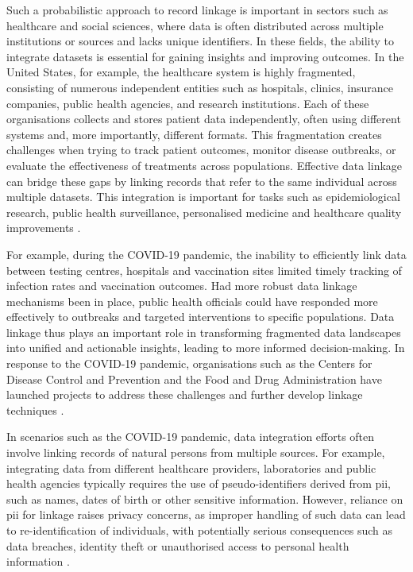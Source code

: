 Such a probabilistic approach to record linkage is important in sectors such as healthcare and social sciences, where data is often distributed across multiple institutions or sources and lacks unique identifiers.
In these fields, the ability to integrate datasets is essential for gaining insights and improving outcomes.
In the United States, for example, the healthcare system is highly fragmented, consisting of numerous independent entities such as hospitals, clinics, insurance companies, public health agencies, and research institutions.
Each of these organisations collects and stores patient data independently, often using different systems and, more importantly, different formats.
This fragmentation creates challenges when trying to track patient outcomes, monitor disease outbreaks, or evaluate the effectiveness of treatments across populations.
Effective data linkage can bridge these gaps by linking records that refer to the same individual across multiple datasets.
This integration is important for tasks such as epidemiological research, public health surveillance, personalised medicine and healthcare quality improvements \cite{pathak2024privacy, vatsalan2017privacy}.

For example, during the COVID-19 pandemic, the inability to efficiently link data between testing centres, hospitals and vaccination sites limited timely tracking of infection rates and vaccination outcomes.
Had more robust data linkage mechanisms been in place, public health officials could have responded more effectively to outbreaks and targeted interventions to specific populations.
Data linkage thus plays an important role in transforming fragmented data landscapes into unified and actionable insights, leading to more informed decision-making.
In response to the COVID-19 pandemic, organisations such as the Centers for Disease Control and Prevention and the Food and Drug Administration have launched projects to address these challenges and further develop linkage techniques \cite{pathak2024privacy}.

In scenarios such as the COVID-19 pandemic, data integration efforts often involve linking records of natural persons from multiple sources.
For example, integrating data from different healthcare providers, laboratories and public health agencies typically requires the use of pseudo-identifiers derived from \ac{pii}, such as names, dates of birth or other sensitive information.
However, reliance on \ac{pii} for linkage raises privacy concerns, as improper handling of such data can lead to re-identification of individuals, with potentially serious consequences such as data breaches, identity theft or unauthorised access to personal health information \cite{pathak2024privacy, schnell2009privacy}.

